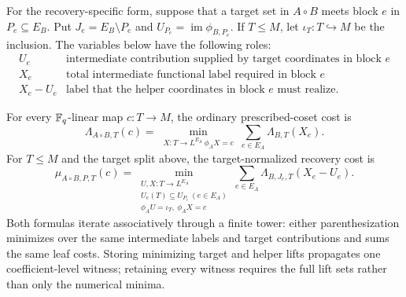 For the recovery-specific form, suppose that a target set in $A\circ B$ meets
block $e$ in $P_e\subseteq E_B$.  Put $J_e=E_B\setminus P_e$ and
$U_{P_e}=\operatorname{im}\phi_{B,P_e}$.  If $T\leq M$, let
$\iota_T:T\hookrightarrow M$ be the inclusion.  The variables below have the
following roles:
\[
\begin{array}{c|l}
 U_e & \text{intermediate contribution supplied by target coordinates in block }e\\
 X_e & \text{total intermediate functional label required in block }e\\
 X_e-U_e & \text{label that the helper coordinates in block }e\text{ must realize.}
\end{array}
\]

\begin{theorem}
\label{prop:prescribed-coset-composition}
%
%
%
For every $\mathbb F_q$-linear map $c:T\to M$, the ordinary prescribed-coset cost is
\begin{equation}
 \Lambda_{A\circ B,T}(c)=
 \min_{\substack{X:T\to L^{E_A}\ \phi_AX=c}}
 \sum_{e\in E_A}\Lambda_{B,T}(X_e).
 \label{eq:coset-cost-composition}
\end{equation}
For $T\leq M$ and the target split above, the target-normalized recovery cost
is
\begin{equation}
 \mu_{A\circ B,P,T}(c)=
 \min_{\substack{U,X:T\to L^{E_A}\\
                  U_e(T)\subseteq U_{P_e}\ (e\in E_A)\\
                  \phi_AU=\iota_T,\ \phi_AX=c}}
 \sum_{e\in E_A}\Lambda_{B,J_e,T}(X_e-U_e).
 \label{eq:target-cost-composition}
\end{equation}
Both formulas iterate associatively through a finite tower: either
parenthesization minimizes over the same intermediate labels and target
contributions and sums the same leaf costs.  Storing minimizing target and
helper lifts propagates one coefficient-level witness; retaining every witness
requires the full lift sets rather than only the numerical minima.
\end{theorem}

